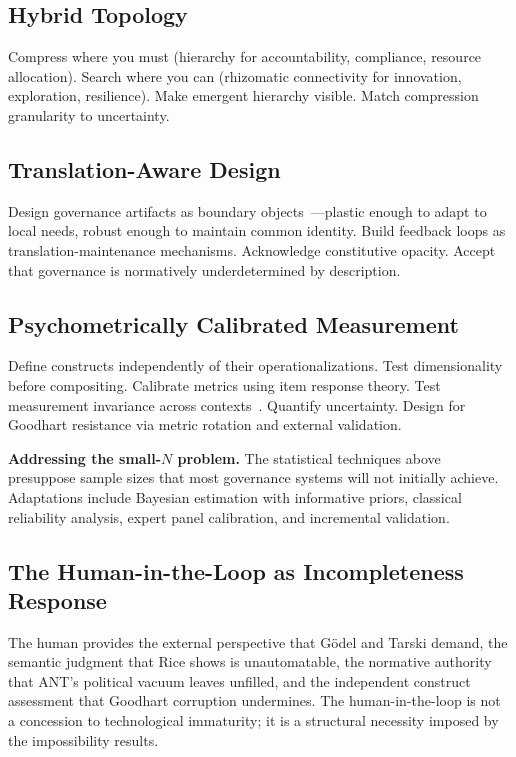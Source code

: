 \documentclass[12pt,a4paper]{article}
\begin{document}
\subsection{Hybrid Topology}

Compress where you must (hierarchy for accountability, compliance, resource
allocation). Search where you can (rhizomatic connectivity for innovation,
exploration, resilience). Make emergent hierarchy visible. Match compression
granularity to uncertainty.

\subsection{Translation-Aware Design}

Design governance artifacts as boundary objects~\cite{StarGriesemer1989}---plastic
enough to adapt to local needs, robust enough to maintain common identity.
Build feedback loops as translation-maintenance mechanisms. Acknowledge
constitutive opacity. Accept that governance is normatively underdetermined by
description.

\subsection{Psychometrically Calibrated Measurement}

Define constructs independently of their operationalizations. Test
dimensionality before compositing. Calibrate metrics using item response
theory. Test measurement invariance across contexts~\cite{Meredith1993}.
Quantify uncertainty. Design for Goodhart resistance via metric rotation and
external validation.

\textbf{Addressing the small-$N$ problem.} The statistical techniques above
presuppose sample sizes that most governance systems will not initially
achieve. Adaptations include Bayesian estimation with informative priors,
classical reliability analysis, expert panel calibration, and incremental
validation.

\subsection{The Human-in-the-Loop as Incompleteness Response}

The human provides the external perspective that G\"{o}del and Tarski demand,
the semantic judgment that Rice shows is unautomatable, the normative
authority that ANT's political vacuum leaves unfilled, and the independent
construct assessment that Goodhart corruption undermines. The human-in-the-loop
is not a concession to technological immaturity; it is a structural necessity
imposed by the impossibility results.
\end{document}
